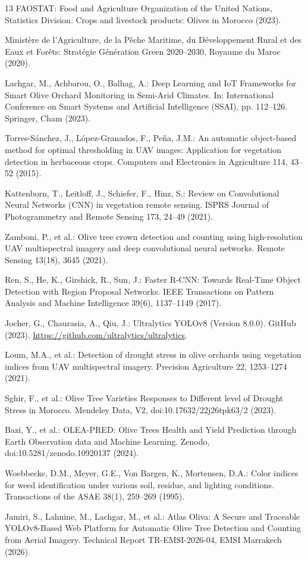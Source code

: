\documentclass[runningheads]{llncs}
\begin{document}
\begin{thebibliography}{13}
FAOSTAT: Food and Agriculture Organization of the United Nations, Statistics Division. Crops and livestock products: Olives in Morocco (2023).

Ministère de l'Agriculture, de la Pêche Maritime, du Développement Rural et des Eaux et Forêts: Stratégie Génération Green 2020--2030, Royaume du Maroc (2020).

Lachgar, M., Achbarou, O., Balhag, A.: Deep Learning and IoT Frameworks for Smart Olive Orchard Monitoring in Semi-Arid Climates. In: International Conference on Smart Systems and Artificial Intelligence (SSAI), pp. 112--126. Springer, Cham (2023).

Torres-Sánchez, J., López-Granados, F., Peña, J.M.: An automatic object-based method for optimal thresholding in UAV images: Application for vegetation detection in herbaceous crops. Computers and Electronics in Agriculture 114, 43--52 (2015).

Kattenborn, T., Leitloff, J., Schiefer, F., Hinz, S.: Review on Convolutional Neural Networks (CNN) in vegetation remote sensing. ISPRS Journal of Photogrammetry and Remote Sensing 173, 24--49 (2021).

Zamboni, P., et al.: Olive tree crown detection and counting using high-resolution UAV multispectral imagery and deep convolutional neural networks. Remote Sensing 13(18), 3645 (2021).

Ren, S., He, K., Girshick, R., Sun, J.: Faster R-CNN: Towards Real-Time Object Detection with Region Proposal Networks. IEEE Transactions on Pattern Analysis and Machine Intelligence 39(6), 1137--1149 (2017).

Jocher, G., Chaurasia, A., Qiu, J.: Ultralytics YOLOv8 (Version 8.0.0). GitHub (2023). \url{https://github.com/ultralytics/ultralytics}.

Loum, M.A., et al.: Detection of drought stress in olive orchards using vegetation indices from UAV multispectral imagery. Precision Agriculture 22, 1253--1274 (2021).

Sghir, F., et al.: Olive Tree Varieties Responses to Different level of Drought Stress in Morocco. Mendeley Data, V2, doi:10.17632/22j26tpk63/2 (2023).

Bazi, Y., et al.: OLEA-PRED: Olive Trees Health and Yield Prediction through Earth Observation data and Machine Learning. Zenodo, doi:10.5281/zenodo.10920137 (2024).

Woebbecke, D.M., Meyer, G.E., Von Bargen, K., Mortensen, D.A.: Color indices for weed identification under various soil, residue, and lighting conditions. Transactions of the ASAE 38(1), 259--269 (1995).

Jamiri, S., Lahnine, M., Lachgar, M., et al.: Atlas Oliva: A Secure and Traceable YOLOv8-Based Web Platform for Automatic Olive Tree Detection and Counting from Aerial Imagery. Technical Report TR-EMSI-2026-04, EMSI Marrakech (2026).
\end{thebibliography}
\end{document}
